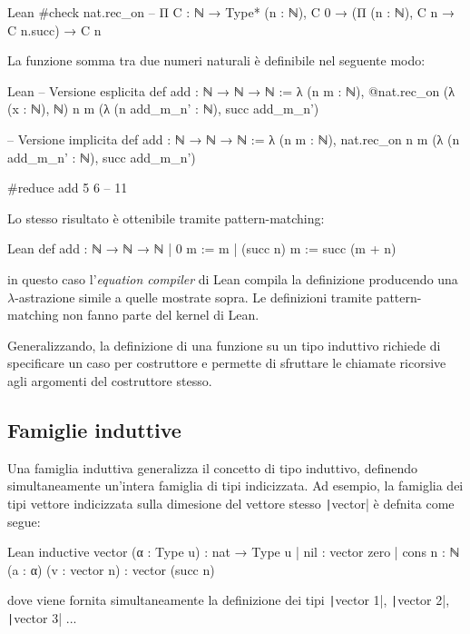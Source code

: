 \begin{code}{Lean}
#check nat.rec_on
-- Π {C : ℕ → Type*} (n : ℕ), C 0 → (Π (n : ℕ), C n → C n.succ) → C n
\end{code}
La funzione somma tra due numeri naturali è definibile nel seguente modo:
\begin{code}{Lean}
-- Versione esplicita
def add : ℕ → ℕ → ℕ :=
  λ (n m : ℕ), @nat.rec_on (λ (x : ℕ), ℕ) n m (λ (n add_m_n' : ℕ), succ add_m_n')

-- Versione implicita
def add : ℕ → ℕ → ℕ :=
  λ (n m : ℕ), nat.rec_on n m (λ (n add_m_n' : ℕ), succ add_m_n')

#reduce add 5 6 -- 11
\end{code}
Lo stesso risultato è ottenibile tramite pattern-matching:
\begin{code}{Lean}
def add : ℕ → ℕ → ℕ
| 0        m := m
| (succ n) m := succ (m + n)
\end{code}
in questo caso l'\emph{equation compiler} di Lean compila la definizione producendo una $\lambda$-astrazione simile a quelle mostrate sopra. Le definizioni tramite pattern-matching non fanno parte del kernel di Lean.

Generalizzando, la definizione di una funzione su un tipo induttivo richiede di specificare un caso per costruttore e permette di sfruttare le chiamate ricorsive agli argomenti del costruttore stesso.

\begin{comment}
Ad esempio, il tipo \begin{mintinline}{Lean} and \end{mintinline} è definito come segue:
\begin{code}{Lean}
inductive and {p : Prop} {q : Prop} : Prop
| intro : p → q → and 
\end{code}
\end{comment}

\subsection{Famiglie induttive}
Una famiglia induttiva generalizza il concetto di tipo induttivo, definendo simultaneamente un'intera famiglia di tipi indicizzata. Ad esempio, la famiglia dei tipi vettore indicizzata sulla dimesione del vettore stesso \texttt|vector| è defnita come segue:
\begin{code}{Lean}
inductive vector (α : Type u) : nat → Type u
| nil {}                              : vector zero
| cons {n : ℕ} (a : α) (v : vector n) : vector (succ n)
\end{code}
dove viene fornita simultaneamente la definizione dei tipi \texttt|vector 1|, \texttt|vector 2|, \texttt|vector 3| ...

